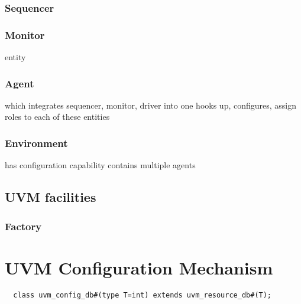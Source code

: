 \documentclass{note}
\begin{document}
\subsubsection{Sequencer}
\bit
\w 
\eit

\subsubsection{Monitor}
\bit
\w {} entity
\eit

\subsubsection{Agent}
\bit
\w {} which integrates sequencer, monitor, driver into one
\w hooks up, configures, assign roles to each of these entities
\eit

\subsubsection{Environment}
\bit
\w has configuration capability
\w contains multiple agents
\eit

\subsection{UVM facilities}
\subsubsection{Factory}
\bit
\w 
\eit

\section{UVM Configuration Mechanism}
\begin{verbatim}
  class uvm_config_db#(type T=int) extends uvm_resource_db#(T);
\end{verbatim}
\end{document}
